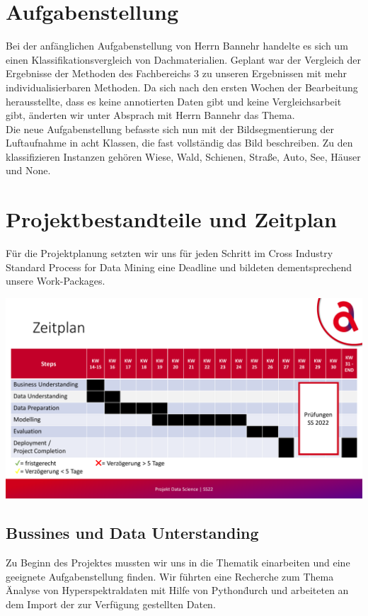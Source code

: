 \section{Aufgabenstellung}
Bei der anfänglichen Aufgabenstellung von Herrn Bannehr handelte es sich um einen Klassifikationsvergleich von Dachmaterialien.
Geplant war der Vergleich der Ergebnisse der Methoden des Fachbereichs 3 zu unseren Ergebnissen mit mehr individualisierbaren Methoden.
Da sich nach den ersten Wochen der Bearbeitung herausstellte, dass es keine annotierten Daten gibt und keine Vergleichsarbeit gibt,
änderten wir unter Absprach mit Herrn Bannehr das Thema.\\
Die neue Aufgabenstellung befasste sich nun mit der Bildsegmentierung der Luftaufnahme in acht Klassen, die fast vollständig
das Bild beschreiben. Zu den klassifizieren Instanzen gehören Wiese, Wald, Schienen, Straße, Auto, See, Häuser und None.

\section{Projektbestandteile und Zeitplan}
Für die Projektplanung setzten wir uns für jeden Schritt im Cross Industry Standard Process for Data Mining eine Deadline
und bildeten dementsprechend unsere Work-Packages.

\begin{center}
\includegraphics[width=15cm]{../../data/Zeitplan}
\end{center}

\subsection{Bussines und Data Unterstanding}
Zu Beginn des Projektes mussten wir uns in die Thematik einarbeiten und eine geeignete Aufgabenstellung finden.
Wir führten eine Recherche zum Thema \"Analyse von Hyperspektraldaten mit Hilfe von Python\"  durch und arbeiteten an
dem Import der zur Verfügung gestellten Daten.

